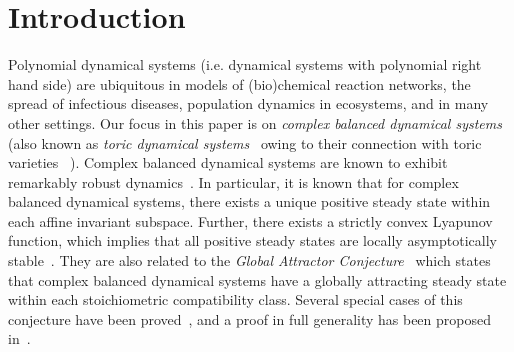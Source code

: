 \documentclass[11pt]{article}
\theoremstyle{plain}
\theoremstyle{definition}
\theoremstyle{remark}
\begin{document}
\tableofcontents


\section{Introduction}


Polynomial dynamical systems (i.e. dynamical systems with polynomial right hand side) are ubiquitous in models of (bio)chemical reaction networks, the spread of infectious diseases, population dynamics in ecosystems, and in many other settings. Our focus in this paper is on {\em complex balanced dynamical systems} (also known as {\em toric dynamical systems}~\cite{CraciunDickensteinShiuSturmfels2009} owing to their connection with toric varieties ~\cite{dickenstein2020algebraic}). Complex balanced dynamical systems are known to exhibit remarkably robust dynamics~\cite{horn1972general}. In particular, it is known that for complex balanced dynamical systems, there exists a unique positive steady state within each affine invariant subspace. Further, there exists a strictly convex Lyapunov function, 
which implies that all positive steady states are locally asymptotically stable~\cite{horn1972general, yu2018mathematical}. They are also related to the \emph{Global Attractor Conjecture}~\cite{CraciunDickensteinShiuSturmfels2009} which states that complex balanced dynamical systems have a globally attracting steady state within each stoichiometric compatibility class. Several special cases of this conjecture have been proved~\cite{gopalkrishnan2014geometric, pantea2012persistence, craciun2013persistence, boros2020permanence}, and a proof in full generality has been proposed in~\cite{craciun2015toric}.
\end{document}
